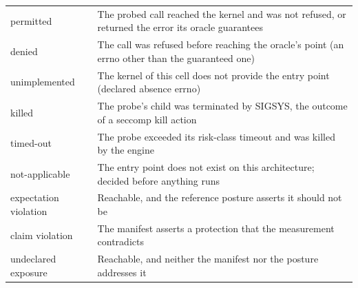 \begin{longtable}{@{}p{3.3cm}p{11.9cm}@{}}
permitted & The probed call reached the kernel and was not refused, or returned the error its oracle guarantees\\
denied & The call was refused before reaching the oracle's point (an errno other than the guaranteed one)\\
unimplemented & The kernel of this cell does not provide the entry point (declared absence errno)\\
killed & The probe's child was terminated by SIGSYS, the outcome of a seccomp kill action\\
timed-out & The probe exceeded its risk-class timeout and was killed by the engine\\
not-applicable & The entry point does not exist on this architecture; decided before anything runs\\
expectation violation & Reachable, and the reference posture asserts it should not be\\
claim violation & The manifest asserts a protection that the measurement contradicts\\
undeclared exposure & Reachable, and neither the manifest nor the posture addresses it\\
\end{longtable}
\endgroup
